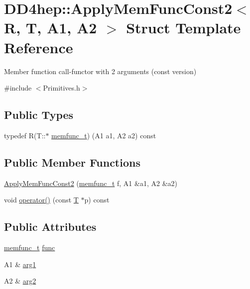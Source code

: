 \hypertarget{struct_d_d4hep_1_1_apply_mem_func_const2}{}\section{D\+D4hep\+:\+:Apply\+Mem\+Func\+Const2$<$ R, T, A1, A2 $>$ Struct Template Reference}
\label{struct_d_d4hep_1_1_apply_mem_func_const2}


Member function call-\/functor with 2 arguments (const version)  




{\ttfamily \#include $<$Primitives.\+h$>$}

\subsection*{Public Types}
\begin{DoxyCompactItemize}
\item 
typedef R(T\+::$\ast$ \hyperlink{struct_d_d4hep_1_1_apply_mem_func_const2_ac0e4dae57560aa3d5f8d489605c714e3}{memfunc\+\_\+t}) (A1 a1, A2 a2) const
\end{DoxyCompactItemize}
\subsection*{Public Member Functions}
\begin{DoxyCompactItemize}
\item 
\hyperlink{struct_d_d4hep_1_1_apply_mem_func_const2_a41c881b9faf4f7f0fe9c82e3a39c4ca0}{Apply\+Mem\+Func\+Const2} (\hyperlink{struct_d_d4hep_1_1_apply_mem_func_const2_ac0e4dae57560aa3d5f8d489605c714e3}{memfunc\+\_\+t} f, A1 \&a1, A2 \&a2)
\item 
void \hyperlink{struct_d_d4hep_1_1_apply_mem_func_const2_a9b8cc42f29b3dbad081e62371ee77f63}{operator()} (const \hyperlink{class_t}{T} $\ast$p) const
\end{DoxyCompactItemize}
\subsection*{Public Attributes}
\begin{DoxyCompactItemize}
\item 
\hyperlink{struct_d_d4hep_1_1_apply_mem_func_const2_ac0e4dae57560aa3d5f8d489605c714e3}{memfunc\+\_\+t} \hyperlink{struct_d_d4hep_1_1_apply_mem_func_const2_a9a9dc912d8f9b572a684ebe92aa0af6d}{func}
\item 
A1 \& \hyperlink{struct_d_d4hep_1_1_apply_mem_func_const2_a5017a4de9fd2e68ad5c13d34ffd7c19d}{arg1}
\item 
A2 \& \hyperlink{struct_d_d4hep_1_1_apply_mem_func_const2_a96f3779267c92dcb4ff855fd360f62d5}{arg2}
\end{DoxyCompactItemize}


